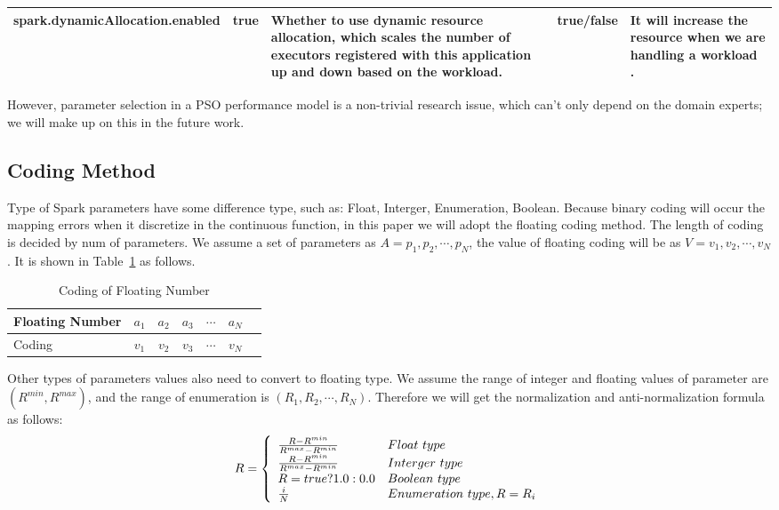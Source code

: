 \begin{table}[t]
\begin{center}
\begin{tabular}{ | c | c  | p{5cm} | c | p{5cm} |}
  \hline
     spark.dynamicAllocation.enabled &  true & Whether to use dynamic resource allocation, which scales the number of executors registered with this application up and down based on the workload. & true/false & It will increase the resource when we are handling a workload .\\
   \hline    
    \end{tabular}
\end{center}	
\end{table}

\par However, parameter selection in a PSO performance model is a non-trivial research issue, which can’t only depend on the domain experts; we will make up on this in the future work.

\subsection{Coding Method}\label{subsec:coding}
\par Type of Spark parameters have some difference type, such as: Float, Interger, Enumeration, Boolean. Because binary coding will occur the mapping errors when it discretize in the continuous function, in this paper we will adopt the floating coding method. The length of coding is decided by num of parameters. We assume a set of parameters as  $A={p_1, p_2, \cdots,  p_N}$, the value of floating coding will be as $V={v_1, v_2, \cdots , v_N}$. It is shown in Table~\ref{tab:coding}  as follows.

\begin{table}[h]
\caption{Coding of Floating Number} \label{tab:coding} 
\begin{center}
    \begin{tabular}{l*{5}{c}r}
    \hline
    Floating Number & $a_1$ & $a_2$ & $a_3$ & $\cdots$ & $a_N$ \\
    \hline
    Coding & $v_1$ & $v_2$ & $v_3$ & $\cdots$ & $v_N$  \\
    \hline
    \end{tabular}
\end{center}
\end{table}
\par Other types of parameters values also need to convert to floating type.  We assume the range of integer and floating values of parameter  are  $(R^{min}, R^{max}) $, and the range of enumeration is $(R_1, R_2, \cdots, R_N)$. Therefore we will get the normalization and anti-normalization formula as follows:
\begin{equation}
R = \left\{ 
\begin{array}{l l l l}
\frac{R-  R^{min} }{ R^{max}-R^{min} } & Float~type \\
\frac{R-  R^{min} }{ R^{max}-R^{min} }  & Interger~type \\
R= true?1.0 : 0.0 & Boolean~type \\
\frac{i}{N} & Enumeration~type, R= R_i  
\end{array} \right.
\end{equation}

